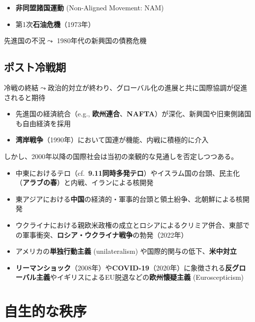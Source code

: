 \documentclass[
  xelatex,
  ja=standard]{bxjsarticle}
\providecommand{\tightlist}{%
  \setlength{\itemsep}{0pt}\setlength{\parskip}{0pt}}\usepackage{longtable,booktabs,array}
\begin{document}
\begin{itemize}
\tightlist
\item
  \textbf{非同盟諸国運動} (Non-Aligned Movement: NAM)
\item
  第1次\textbf{石油危機}（1973年）
\end{itemize}

先進国の不況\(\leadsto\) 1980年代の新興国の債務危機

\hypertarget{ux30ddux30b9ux30c8ux51b7ux6226ux671f}{%
\subsection{ポスト冷戦期}\label{ux30ddux30b9ux30c8ux51b7ux6226ux671f}}

冷戦の終結\(\leadsto\)政治的対立が終わり、グローバル化の進展と共に国際協調が促進されると期待

\begin{itemize}
\tightlist
\item
  先進国の経済統合（e.g.,
  \textbf{欧州連合}、\textbf{NAFTA}）が深化、新興国や旧東側諸国も自由経済を採用
\item
  \textbf{湾岸戦争}（1990年）において国連が機能、内戦に積極的に介入
\end{itemize}

しかし、2000年以降の国際社会は当初の楽観的な見通しを否定しつつある。

\begin{itemize}
\tightlist
\item
  中東におけるテロ（cf.~\textbf{9.11同時多発テロ}）やイスラム国の台頭、民主化（\textbf{アラブの春}）と内戦、イランによる核開発
\item
  東アジアにおける\textbf{中国}の経済的・軍事的台頭と領土紛争、北朝鮮による核開発
\item
  ウクライナにおける親欧米政権の成立とロシアによるクリミア併合、東部での軍事衝突、\textbf{ロシア・ウクライナ戦争}の勃発（2022年）
\item
  アメリカの\textbf{単独行動主義} (unilateralism)
  や国際的関与の低下、\textbf{米中対立}
\item
  \textbf{リーマンショック}（2008年）や\textbf{COVID-19}（2020年）に象徴される\textbf{反グローバル主義}やイギリスによるEU脱退などの\textbf{欧州懐疑主義}
  (Euroscepticism)
\end{itemize}

\hypertarget{ux81eaux751fux7684ux306aux79e9ux5e8f}{%
\section{自生的な秩序}\label{ux81eaux751fux7684ux306aux79e9ux5e8f}}
\end{document}
